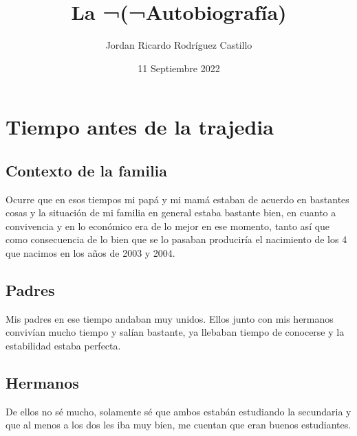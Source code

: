 \documentclass[letterpaper, 12pt]{article}
\title{La ¬(¬Autobiografía)}
\author{Jordan Ricardo Rodríguez Castillo}
\date{11 Septiembre 2022}
\begin{document}
\maketitle

\section*{Tiempo antes de la trajedia}

    \subsection*{Contexto de la familia}
    
    Ocurre que en esos tiempos mi papá y mi mamá estaban de acuerdo en bastantes cosas y la situación de mi familia en general estaba bastante bien, en cuanto a convivencia y en lo económico era de lo mejor en ese momento, tanto así que como consecuencia de lo bien que se lo pasaban produciría el nacimiento de los 4 que nacimos en los años de 2003 y 2004.
    
    
    \subsection*{Padres}
    
    Mis padres en ese tiempo andaban muy unidos. Ellos junto con mis hermanos convivían mucho tiempo y salían bastante, ya llebaban tiempo de conocerse y la estabilidad estaba perfecta.
    
    
    \subsection*{Hermanos}
    
    De ellos no sé mucho, solamente sé que ambos estabán estudiando la secundaria y que al menos a los dos les iba muy bien, me cuentan que eran buenos estudiantes.
    
\end{document}
